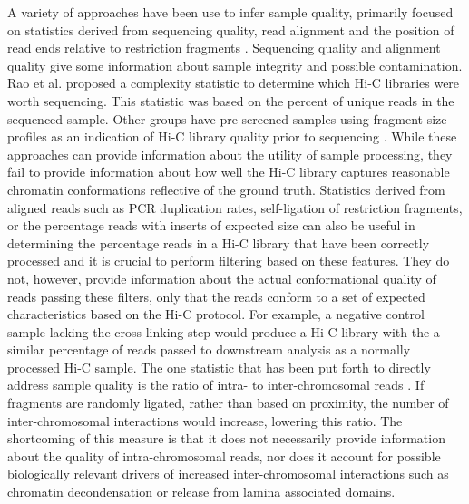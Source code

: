 A variety of approaches have been use to infer sample quality, primarily focused on statistics derived from sequencing quality, read alignment and the position of read ends relative to restriction fragments \cite{sexton_three-dimensional_2012,dixon_topological_2012,le_dily_distinct_2014,rao_3d_2014,stevens_3d_2017,phanstiel_static_2017,nora_targeted_2017}. Sequencing quality and alignment quality give some information about sample integrity and possible contamination. Rao et al. \cite{rao_3d_2014} proposed a complexity statistic to determine which Hi-C libraries were worth sequencing. This statistic was based on the percent of unique reads in the sequenced sample. Other groups have pre-screened samples using fragment size profiles as an indication of Hi-C library quality prior to sequencing \cite{stevens_3d_2017,phanstiel_static_2017}. While these approaches can provide information about the utility of sample processing, they fail to provide information about how well the Hi-C library captures reasonable chromatin conformations reflective of the ground truth. Statistics derived from aligned reads such as PCR duplication rates, self-ligation of restriction fragments, or the percentage reads with inserts of expected size can also be useful in determining the percentage reads in a Hi-C library that have been correctly processed and it is crucial to perform filtering based on these features. They do not, however, provide information about the actual conformational quality of reads passing these filters, only that the reads conform to a set of expected characteristics based on the Hi-C protocol. For example, a negative control sample lacking the cross-linking step would produce a Hi-C library with the a similar percentage of reads  passed to downstream analysis as a normally processed Hi-C sample. The one statistic that has been put forth to directly address sample quality is the ratio of intra- to inter-chromosomal reads \cite{nagano_comparison_2015}. If fragments are randomly ligated, rather than based on proximity, the number of inter-chromosomal interactions would increase, lowering this ratio. The shortcoming of this measure is that it does not necessarily provide information about the quality of intra-chromosomal reads, nor does it account for possible biologically relevant drivers of increased inter-chromosomal interactions such as chromatin decondensation or release from lamina associated domains.

